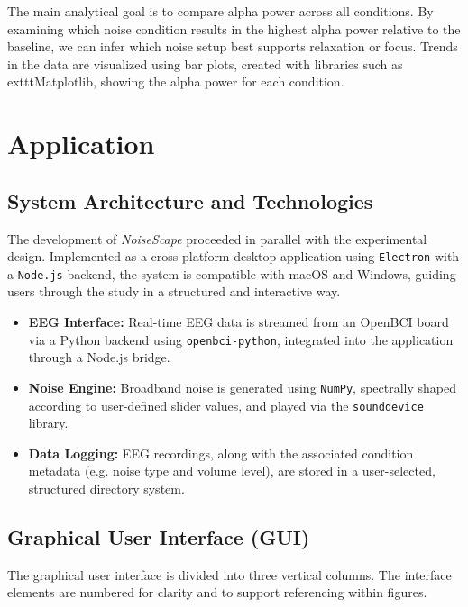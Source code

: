 The main analytical goal is to compare alpha power across all conditions. By examining which noise condition results in the highest alpha power relative to the baseline, we can infer which noise setup best supports relaxation or focus. Trends in the data are visualized using bar plots, created with libraries such as 	exttt{Matplotlib}, showing the alpha power for each condition.






\section{Application}

\subsection{System Architecture and Technologies}

The development of \textit{NoiseScape} proceeded in parallel with the experimental design. Implemented as a cross-platform desktop application using \texttt{Electron} with a \texttt{Node.js} backend, the system is compatible with macOS and Windows, guiding users through the study in a structured and interactive way.

\begin{itemize}
\item \textbf{EEG Interface:} Real-time EEG data is streamed from an OpenBCI board via a Python backend using \texttt{openbci-python}, integrated into the application through a Node.js bridge.
\item \textbf{Noise Engine:} Broadband noise is generated using \texttt{NumPy}, spectrally shaped according to user-defined slider values, and played via the \texttt{sounddevice} library.
\item \textbf{Data Logging:} EEG recordings, along with the associated condition metadata (e.g. noise type and volume level), are stored in a user-selected, structured directory system.
\end{itemize}

\subsection{Graphical User Interface (GUI)}

The graphical user interface is divided into three vertical columns. The interface elements are numbered for clarity and to support referencing within figures.

